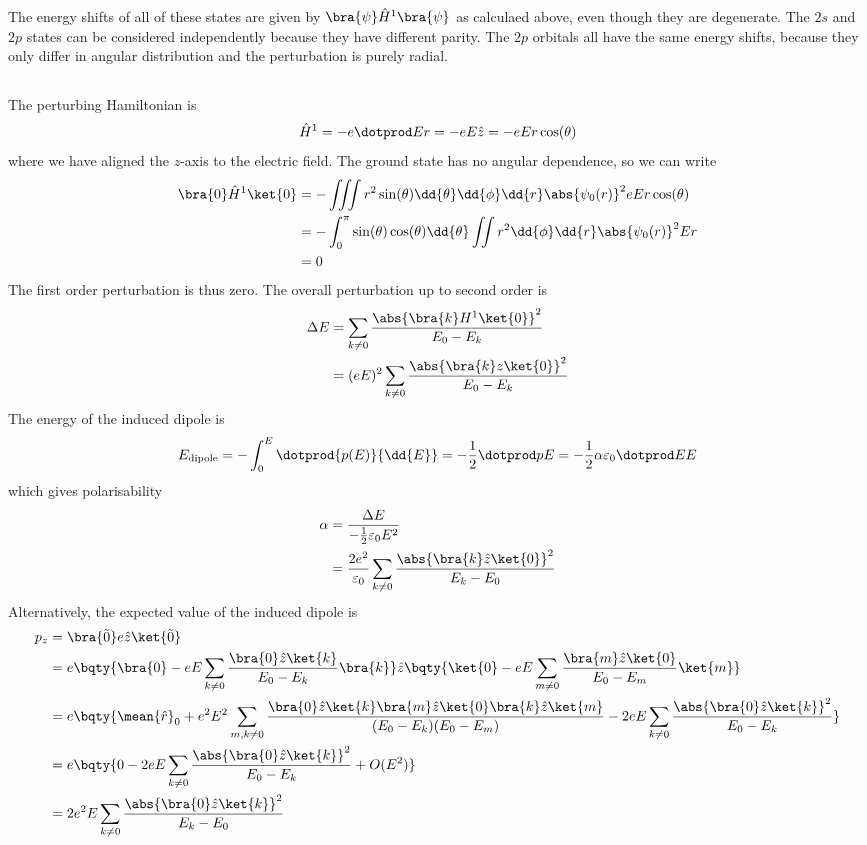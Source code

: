 \documentclass[12pt]{article}
\begin{document}
        The energy shifts of all of these states are given by \(\bra{\psi} \hat{H}^1 \bra{\psi} \) as calculaed above, even though they are degenerate. The \(2s\) and \(2p\) states can be considered independently because they have different parity. The \(2p\) orbitals all have the same energy shifts, because they only differ in angular distribution and the perturbation is purely radial.
        \subsection{} The perturbing Hamiltonian is \[
            \hat{H}^1 = - e\dotprod Er = - e E \hat{z} = - eE r\cos(\theta)
        \]
        where we have aligned the \(z\)-axis to the electric field. The ground state has no angular dependence, so we can write \begin{align*}
            \bra{0} \hat{H}^1 \ket{0} &= -\iiint r^2 \sin(\theta) \dd{\theta} \dd{\phi}\dd{r}\abs{\psi_0(r)}^2 eE r \cos(\theta)\\
            &= -\int_0^{\pi} \sin(\theta) \cos(\theta) \dd{\theta} \iint r^2  \dd{\phi}\dd{r}\abs{\psi_0(r)}^2 E r \\
            &= 0
        \end{align*}
        The first order perturbation is thus zero. The overall perturbation up to second order is \begin{align*}
            \Delta E &= \sum_{k\neq 0} \frac{\abs{\bra{k} H^1 \ket{0} }^2}{E_0 - E_k} \\
            &= (eE)^2 \sum_{k\neq 0} \frac{\abs{\bra{k} z \ket{0} }^2}{E_0 - E_k}
        \end{align*}
        The energy of the induced dipole is \[
            E_{\text{dipole}}= -\int_0^E \dotprod{p(E)}{\dd{E}} = -\frac{1}{2}\dotprod p E = -\frac{1}{2}\alpha \varepsilon_0 \dotprod E E
        \]
        which gives polarisability \begin{align*}
            \alpha &= \frac{\Delta E }{ -\frac{1}{2}\varepsilon_0 E^2}\\
            &= \frac{2e^2}{\varepsilon_0}  \sum_{k\neq 0} \frac{\abs{\bra{k} \hat{z} \ket{0} }^2}{E_k - E_0}
        \end{align*}
        Alternatively, the expected value of the induced dipole is \begin{align*}
            p_z &= \bra{\tilde{0}} e \hat{z} \ket{\tilde{0}}\\
            &= e\bqty{\bra{0} - eE \sum_{k\neq 0} \frac{\bra{0} \hat{z} \ket{k} }{E_0 - E_k} \bra{k} } \hat{z}\bqty{\ket{0} - eE \sum_{m\neq 0} \frac{\bra{m} \hat{z} \ket{0} }{E_0 - E_m} \ket{m} } \\
            &= e\bqty{ \mean{\hat{r}}_0 + e^2 E^2\sum_{m,k\neq 0} \frac{\bra{0} \hat{z} \ket{k} \bra{m} \hat{z} \ket{0} \bra{k} \hat{z} \ket{m} }{(E_0 - E_k)(E_0 - E_m)} - 2eE \sum_{k\neq 0} \frac{\abs{\bra{0} \hat{z} \ket{k}}^2}{E_0 - E_k} } \\
            &= e\bqty{0 - 2eE \sum_{k\neq 0} \frac{\abs{\bra{0} \hat{z} \ket{k}}^2}{E_0 - E_k} + O(E^2)}\\
            &= 2e^2E \sum_{k\neq 0} \frac{\abs{\bra{0} \hat{z} \ket{k}}^2}{E_k - E_0}
        \end{align*}
\end{document}
